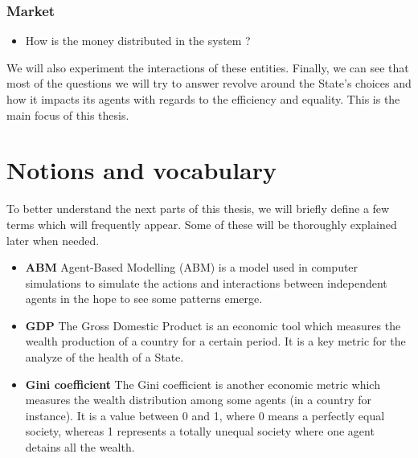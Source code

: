 \subsubsection{Market}

\begin{itemize}
    \item How is the money distributed in the system ? 
\end{itemize}



\noindent We will also experiment the interactions of these entities. Finally, we can see that most of the questions we will try to answer revolve around the State's choices and how it impacts its agents with regards to the efficiency and equality. This is the main focus of this thesis.

\section{Notions and vocabulary}
To better understand the next parts of this thesis, we will briefly define a few terms which will frequently appear. Some of these will be thoroughly explained later when needed.

\begin{itemize}
    \item \textbf{ABM} Agent-Based Modelling (ABM) is a model used in computer simulations to simulate the actions and interactions between independent agents in the hope to see some patterns emerge.
    \item \textbf{GDP} The Gross Domestic Product is an economic tool which measures the wealth production of a country for a certain period. It is a key metric for the analyze of the health of a State.
    \item \textbf{Gini coefficient} The Gini coefficient is another economic metric which measures the wealth distribution among some agents (in a country for instance). It is a value between 0 and 1, where 0 means a perfectly equal society, whereas 1 represents a totally unequal society where one agent detains all the wealth.
\end{itemize}